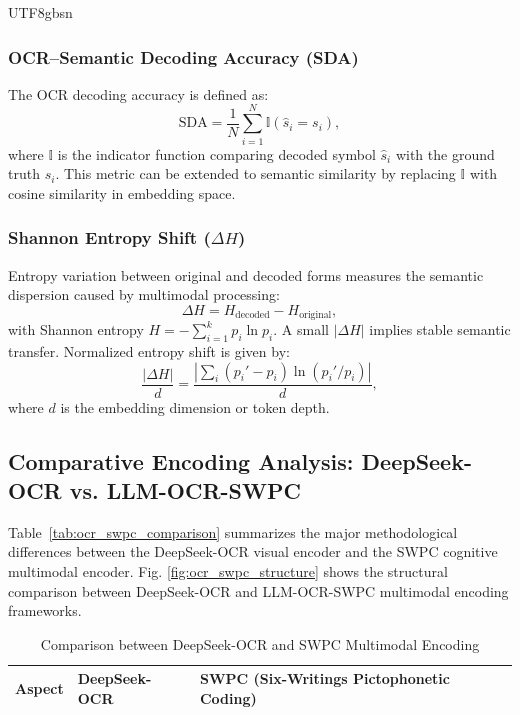 \documentclass[conference]{IEEEtran}
\begin{document}
\begin{CJK*}{UTF8}{gbsn}
\subsubsection{OCR–Semantic Decoding Accuracy (SDA)}

The OCR decoding accuracy is defined as:
\begin{equation}
\text{SDA} = \frac{1}{N} \sum_{i=1}^{N} \mathbb{I}(\hat{s}_i = s_i),
\end{equation}
where $\mathbb{I}$ is the indicator function comparing decoded symbol $\hat{s}_i$ with the ground truth $s_i$.  
This metric can be extended to semantic similarity by replacing $\mathbb{I}$ with cosine similarity in embedding space.

\subsubsection{Shannon Entropy Shift ($\Delta H$)}

Entropy variation between original and decoded forms measures the semantic dispersion caused by multimodal processing:
\begin{equation}
\Delta H = H_{\text{decoded}} - H_{\text{original}},
\end{equation}
with Shannon entropy $H = - \sum_{i=1}^{k} p_i \ln p_i$.  
A small $|\Delta H|$ implies stable semantic transfer.  
Normalized entropy shift is given by:
\begin{equation}
\frac{|\Delta H|}{d} = \frac{|\sum_i (p_i' - p_i)\ln(p_i'/p_i)|}{d},
\end{equation}
where $d$ is the embedding dimension or token depth.

\subsection{Comparative Encoding Analysis: DeepSeek-OCR vs. LLM-OCR-SWPC}

Table~\ref{tab:ocr_swpc_comparison} summarizes the major methodological differences between the DeepSeek-OCR visual encoder and the SWPC cognitive multimodal encoder. Fig. \ref{fig:ocr_swpc_structure} shows the structural comparison between DeepSeek-OCR and LLM-OCR-SWPC multimodal encoding frameworks.

\begin{table}[htbp]
\caption{Comparison between DeepSeek-OCR and SWPC Multimodal Encoding}
\begin{center}
\begin{tabular}{|c|p{4.2cm}|p{6.5cm}|}
\hline
\textbf{Aspect} & \textbf{DeepSeek-OCR} & \textbf{SWPC (Six-Writings Pictophonetic Coding)} \\
\hline


\end{tabular}
\end{center}
\end{table}
\end{CJK*}
\end{document}

